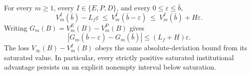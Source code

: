 \begin{theorem}\label{thm:stability}
For every $m\geq1$, every $I\in\{E,P,D\}$, and every $0\leq\varepsilon\leq\bar b$,
\begin{equation}\label{eq:stability}
 V_m^I(\bar b)-L_f\varepsilon
 \ \leq\ V_m^I(\bar b-\varepsilon)
 \ \leq\ V_m^I(\bar b)+H\varepsilon.
\end{equation}
Writing $G_m(B)=V_m^E(B)-V_m^P(B)$ gives
\begin{equation}\label{eq:gap-stability}
 |G_m(\bar b-\varepsilon)-G_m(\bar b)|
 \leq (L_f+H)\varepsilon.
\end{equation}
The loss $V_\infty(B)-V_m^I(B)$ obeys the same absolute-deviation bound from its saturated value. In particular, every strictly positive saturated institutional advantage persists on an explicit nonempty interval below saturation.
\end{theorem}
